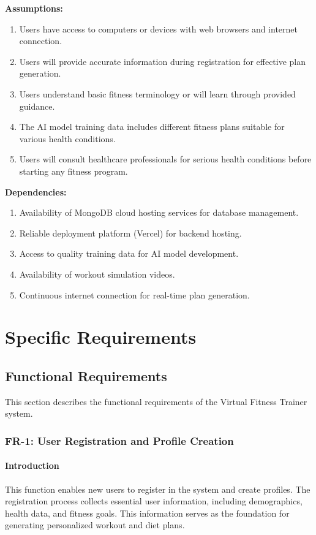 \documentclass[12pt,a4paper]{article}
\begin{document}
\textbf{Assumptions:}
\begin{enumerate}
    \item Users have access to computers or devices with web browsers and internet connection.
    \item Users will provide accurate information during registration for effective plan generation.
    \item Users understand basic fitness terminology or will learn through provided guidance.
    \item The AI model training data includes different fitness plans suitable for various health conditions.
    \item Users will consult healthcare professionals for serious health conditions before starting any fitness program.
\end{enumerate}

\textbf{Dependencies:}
\begin{enumerate}
    \item Availability of MongoDB cloud hosting services for database management.
    \item Reliable deployment platform (Vercel) for backend hosting.
    \item Access to quality training data for AI model development.
    \item Availability of workout simulation videos.
    \item Continuous internet connection for real-time plan generation.
\end{enumerate}

\newpage

\section{Specific Requirements}

\subsection{Functional Requirements}

This section describes the functional requirements of the Virtual Fitness Trainer system.

\subsubsection{FR-1: User Registration and Profile Creation}

\paragraph{Introduction}
This function enables new users to register in the system and create profiles. The registration process collects essential user information, including demographics, health data, and fitness goals. This information serves as the foundation for generating personalized workout and diet plans.
\end{document}
